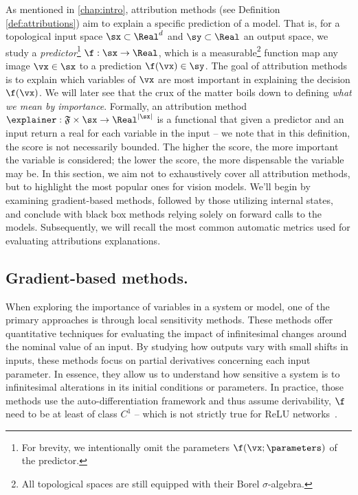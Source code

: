 As mentioned in \autoref{chap:intro}, attribution methods (see Definition \ref{def:attributions}) aim to explain a specific prediction of a model. That is, for a topological input space $\sx \subset \Real^d$ and $\sy \subset \Real$ an output space, we study a \textit{predictor}\footnote{For brevity, we intentionally omit the parameters $\f(\vx; \parameters)$ of the predictor.} $\f : \sx \to \Real$, which is a measurable\footnote{All topological spaces are still equipped with their Borel $\sigma$-algebra.} function map any image $\vx \in \sx$ to a prediction $\f(\vx) \in \sy$.
The goal of attribution methods is to explain which variables of $\vx$ are most important in explaining the decision $\f(\vx)$. We will later see that the crux of the matter boils down to defining \textit{what we mean by importance}. 
Formally, an attribution method $\explainer : \mathfrak{F} \times \sx \to \Real^{|\sx|}$ is a functional that given a predictor and an input return a real for each variable in the input -- we note that in this definition, the score is not necessarily bounded. The higher the score, the more important the variable is considered; the lower the score, the more dispensable the variable may be. 
In this section, we aim not to exhaustively cover all attribution methods, but to highlight the most popular ones for vision models. We'll begin by examining gradient-based methods, followed by those utilizing internal states, and conclude with black box methods relying solely on forward calls to the models. Subsequently, we will recall the most common automatic metrics used for evaluating attributions explanations.


\subsection{Gradient-based methods.}

When exploring the importance of variables in a system or model, one of the primary approaches is through local sensitivity methods. These methods offer quantitative techniques for evaluating the impact of infinitesimal changes around the nominal value of an input. By studying how outputs vary with small shifts in inputs, these methods focus on partial derivatives concerning each input parameter. In essence, they allow us to understand how sensitive a system is to infinitesimal alterations in its initial conditions or parameters. 
In practice, those methods use the auto-differentiation framework and thus assume derivability, $\f$ need to be at least of class $C^1$ -- which is not strictly true for ReLU networks~\cite{bertoin2021numerical}.

